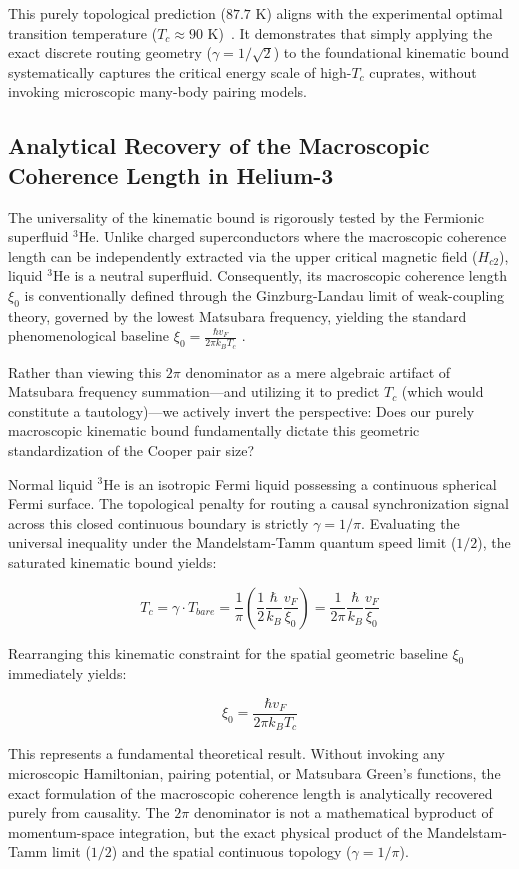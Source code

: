 \documentclass[11pt,a4paper]{article}
\begin{document}
This purely topological prediction ($87.7 \text{ K}$) aligns with the experimental optimal transition temperature ($T_c \approx 90 \text{ K}$)~\cite{Presland1991}. It demonstrates that simply applying the exact discrete routing geometry ($\gamma = 1/\sqrt{2}$) to the foundational kinematic bound systematically captures the critical energy scale of high-$T_c$ cuprates, without invoking microscopic many-body pairing models.

\subsection*{Analytical Recovery of the Macroscopic Coherence Length in Helium-3}

The universality of the kinematic bound is rigorously tested by the Fermionic superfluid $^3$He. Unlike charged superconductors where the macroscopic coherence length can be independently extracted via the upper critical magnetic field ($H_{c2}$), liquid $^3$He is a neutral superfluid. Consequently, its macroscopic coherence length $\xi_0$ is conventionally defined through the Ginzburg-Landau limit of weak-coupling theory, governed by the lowest Matsubara frequency, yielding the standard phenomenological baseline $\xi_0 = \frac{\hbar v_F}{2\pi k_B T_c}$ \cite{Vollhardt2013}.

Rather than viewing this $2\pi$ denominator as a mere algebraic artifact of Matsubara frequency summation—and utilizing it to predict $T_c$ (which would constitute a tautology)—we actively invert the perspective: Does our purely macroscopic kinematic bound fundamentally dictate this geometric standardization of the Cooper pair size?

Normal liquid $^3$He is an isotropic Fermi liquid possessing a continuous spherical Fermi surface. The topological penalty for routing a causal synchronization signal across this closed continuous boundary is strictly $\gamma = 1/\pi$. Evaluating the universal inequality under the Mandelstam-Tamm quantum speed limit ($1/2$), the saturated kinematic bound yields:

$$T_c = \gamma \cdot T_{bare} = \frac{1}{\pi} \left( \frac{1}{2} \frac{\hbar}{k_B} \frac{v_F}{\xi_0} \right) = \frac{1}{2\pi} \frac{\hbar}{k_B} \frac{v_F}{\xi_0}$$

Rearranging this kinematic constraint for the spatial geometric baseline $\xi_0$ immediately yields:

$$\xi_0 = \frac{\hbar v_F}{2\pi k_B T_c}$$

This represents a fundamental theoretical result. Without invoking any microscopic Hamiltonian, pairing potential, or Matsubara Green's functions, the exact formulation of the macroscopic coherence length is analytically recovered purely from causality. The $2\pi$ denominator is not a mathematical byproduct of momentum-space integration, but the exact physical product of the Mandelstam-Tamm limit ($1/2$) and the spatial continuous topology ($\gamma = 1/\pi$).
\end{document}
